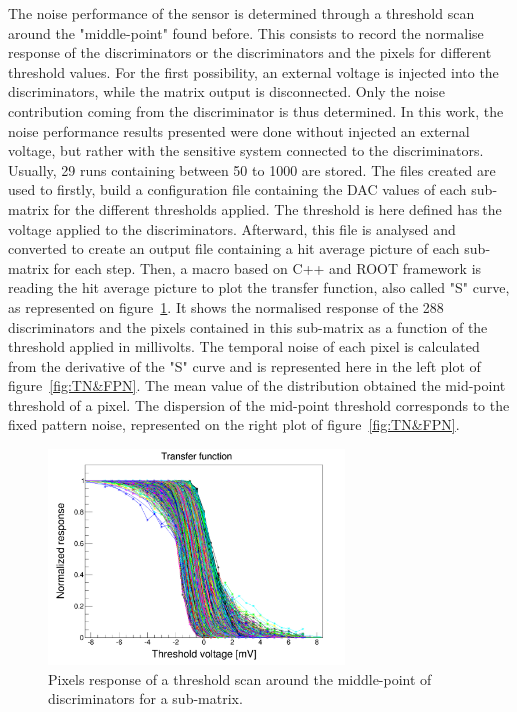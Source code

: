   The noise performance of the sensor is determined through a threshold scan around the "middle-point" found before.
  This consists to record the normalise response of the discriminators or the discriminators and the pixels for different threshold values.
  For the first possibility, an external voltage is injected into the discriminators, while the matrix output is disconnected.
  Only the noise contribution coming from the discriminator is thus determined.
  In this work, the noise performance results presented were done without injected an external voltage, but rather with the sensitive system connected to the discriminators.
  Usually, 29 runs containing between 50 to 1000 are stored.
  The files created are used to firstly, build a configuration file containing the \gls{DAC} values of each sub-matrix for the different thresholds applied.
  The threshold is here defined has the voltage applied to the discriminators.
  Afterward, this file is analysed and converted to create an output file containing a hit average picture of each sub-matrix for each step.
  Then, a macro based on C++ and ROOT framework is reading the hit average picture to plot the transfer function, also called "S" curve, as represented on figure~\ref{fig:transfer}.
  It shows the normalised response of the 288 discriminators and the pixels contained in this sub-matrix as a function of the threshold applied in millivolts.
  The temporal noise of each pixel is calculated from the derivative of the "S" curve and is represented here in the left plot of figure~\ref{fig:TN&FPN}.
  The mean value of the distribution obtained the mid-point threshold of a pixel.
  The dispersion of the mid-point threshold corresponds to the fixed pattern noise, represented on the right plot of figure~\ref{fig:TN&FPN}.
  
  \begin{figure}[!h]
    \centering
    \includegraphics[width=0.7\textwidth]{Pictures/labTests/transfer_B.png}
    \caption{Pixels response of a threshold scan around the middle-point of discriminators for a sub-matrix.}
    \label{fig:transfer}
  \end{figure}

